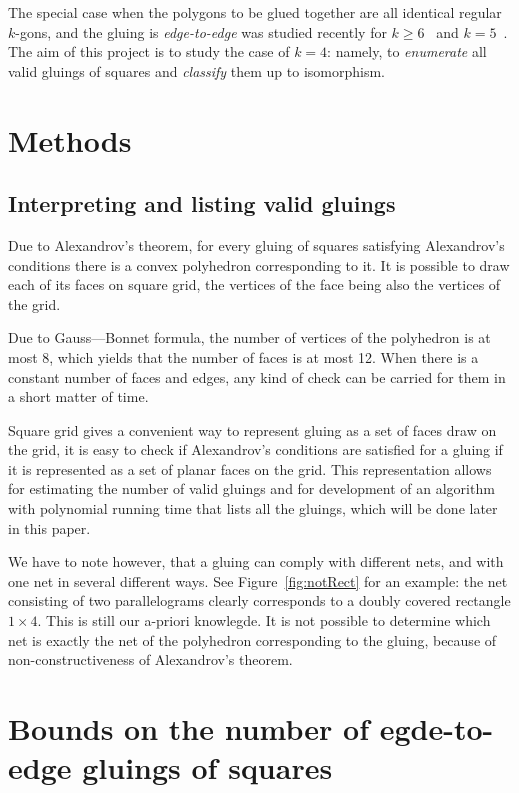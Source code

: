 \documentclass[a4paper,11pt]{article}
\begin{document}
The special case when the polygons to be glued together are all identical regular $k$-gons, and the gluing is \emph{edge-to-edge} was studied recently for $k \ge 6$~\cite{kl17-hex} and $k=5$~\cite{alz-penta}. The aim of this project is to study the case of $k=4$: namely, to {\it enumerate} all valid gluings of squares and {\it classify} them up to isomorphism.

\section{Methods}

\subsection{Interpreting and listing valid gluings}

Due to Alexandrov's theorem, for every gluing of squares satisfying Alexandrov's conditions there is a convex polyhedron corresponding to it. It is possible to draw each of its faces on square grid, the vertices of the face being also the vertices of the grid.

Due to Gauss—Bonnet formula, the number of vertices of the polyhedron is at most 8, which yields that the number of faces is at most 12. When there is a constant number of faces and edges, any kind of check can be carried for them in a short matter of time.

Square grid gives a convenient way to represent gluing as a set of faces draw on the grid, it is easy to check if Alexandrov's conditions are satisfied for a gluing if it is represented as a set of planar faces on the grid. This representation allows for estimating the number of valid gluings and for development of an algorithm with polynomial running time that lists all the gluings, which will be done later in this paper.

We have to note however, that a gluing can comply with different nets, and with one net in several different ways. See Figure~\ref{fig:notRect} for an example: the net consisting of two parallelograms clearly corresponds to a doubly covered rectangle $1 \times 4$. This is still our a-priori knowlegde. It is not possible to determine which net is exactly the net of the polyhedron corresponding to the gluing, because of non-constructiveness of Alexandrov's theorem.

% 

\section{Bounds on the number of egde-to-edge gluings of squares}
\end{document}
